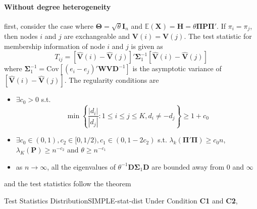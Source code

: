 \documentclass[twoside]{article}
\begin{document}
\paragraph*{Without degree heterogeneity} first, consider the case where $\boldsymbol{\Theta}=\sqrt{\theta}\mathbf{I}_n$ and $\mathbb{E}\left(\mathbf{X}\right) = \mathbf{H} = \theta\boldsymbol{\Pi}\mathbf{P}\boldsymbol{\Pi}'$. If $\pi_i = \pi_j$, then nodes $i$ and $j$ are exchangeable and $\mathbf{V}(i)=\mathbf{V}(j)$. The test statistic for membership information of node $i$ and $j$ is given as 
$$
T_{ij} = \left[\hat{\mathbf{V}}(i) - \hat{\mathbf{V}}(j)\right]'\boldsymbol{\Sigma}_1^{-1} \left[\hat{\mathbf{V}}(i) - \hat{\mathbf{V}}(j)\right]
$$
where $\boldsymbol{\Sigma}_1^{-1} = \mathrm{Cov}\left[(e_i - e_j)' \mathbf{WVD}^{-1}\right]$ is the asymptotic variance of $\left[\hat{\mathbf{V}}(i) - \hat{\mathbf{V}}(j)\right]$. The regularity conditions are 
\begin{itemize}
    \item[\textbf{C1}] $\exists c_0 >0$ s.t. $$ \min \left\{ \frac{\left\vert d_i \right\vert}{\left\vert d_j \right\vert}: 1\leq i\leq j\leq K, d_i\neq -d_j \right\} \geq 1+c_0 $$
    \item[\textbf{C2}] $\exists c_0\in (0,1), c_2\in [0,1/2), c_1\in (0,1-2c_2)$ s.t. $\lambda_k\left(\boldsymbol{\Pi'\Pi}\right) \geq c_0 n$, $\lambda_K(\mathbf{P})\geq n^{-c_2}$ and $\theta \geq n^{-c_1}$
    \item[\textbf{C3}] as $n\rightarrow \infty$, all the eigenvalues of $\theta^{-1}\mathbf{D}\boldsymbol{\Sigma}_1\mathbf{D}$ are bounded away from $0$ and $\infty$
\end{itemize}

and the test statistics follow the theorem 
\begin{theorem}{Test Statistics Distribution}{SIMPLE-stat-dist}
    Under Condition \textbf{C1} and \textbf{C2}, 
\end{theorem}

\newpage


\end{document}
